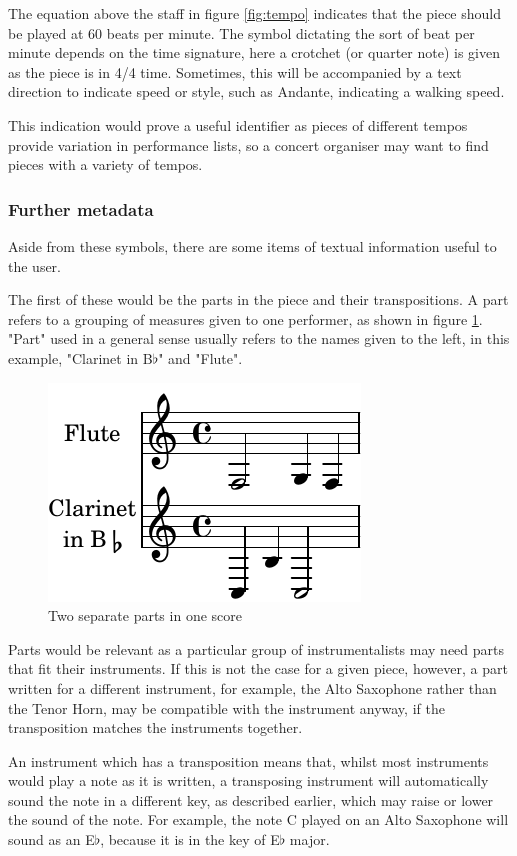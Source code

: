 The equation above the staff in figure \ref{fig:tempo} indicates that the piece should be played at 60 beats per minute. The symbol dictating the sort of beat per minute depends on the time signature, here a crotchet (or quarter note) is given as the piece is in 4/4 time. Sometimes, this will be accompanied by a text direction to indicate speed or style, such as Andante, indicating a walking speed.

This indication would prove a useful identifier as pieces of different tempos provide variation in performance lists, so a concert organiser may want to find pieces with a variety of tempos.

\subsubsection{Further metadata}
Aside from these symbols, there are some items of textual information useful to the user. 

The first of these would be the parts in the piece and their transpositions. A part refers to a grouping of measures given to one performer, as shown in figure \ref{fig:parts}. "Part" used in a general sense usually refers to the names given to the left, in this example, "Clarinet in B$\flat$" and "Flute".
\begin{figure}[H]
\centering
\includegraphics{multiparts-crop}
\caption{Two separate parts in one score}
\label{fig:parts}	
\end{figure}

Parts would be relevant as a particular group of instrumentalists may need parts that fit their instruments. If this is not the case for a given piece, however, a part written for a different instrument, for example, the Alto Saxophone rather than the Tenor Horn, may be compatible with the instrument anyway, if the transposition matches the instruments together. 

An instrument which has a transposition means that, whilst most instruments would play a note as it is written, a transposing instrument will automatically sound the note in a different key, as described earlier, which may raise or lower the sound of the note. For example, the note C played on an Alto Saxophone will sound as an E$\flat$, because it is in the key of E$\flat$ major. 


